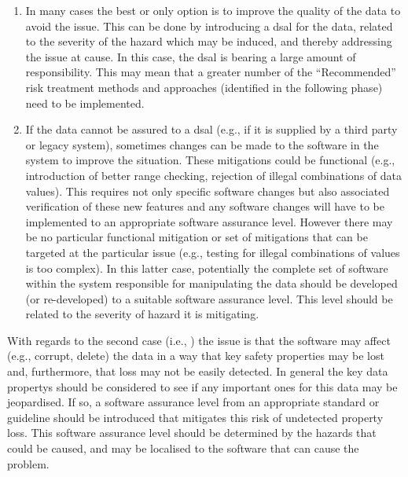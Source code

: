\begin{enumerate}
  \item {} In many cases the best or only option is to improve the quality of the data to avoid the issue. This can be done by introducing a \gls{dsal} for the data, related to the severity of the \gls{hazard} which may be induced, and thereby addressing the issue at cause. In this case, the \gls{dsal} is bearing a large amount of responsibility. This may mean that a greater number of the ``Recommended'' risk \gls{treatment} methods and approaches (identified in the following phase) need to be implemented.
  \item {} If the data cannot be assured to a \gls{dsal} (e.g., if it is supplied by a third party or legacy system), sometimes changes can be made to the software in the system to improve the situation. These mitigations could be functional (e.g., introduction of better range checking, rejection of illegal combinations of data values). This requires not only specific software changes but also associated \gls{verification} of these new features and any software changes will have to be implemented to an appropriate \gls{software assurance level}. However there may be no particular functional mitigation or set of mitigations that can be targeted at the particular issue (e.g., testing for illegal combinations of values is too complex). In this latter case, potentially the complete set of software within the system responsible for manipulating the data should be developed (or re-developed) to a suitable \gls{software assurance level}. This level should be related to the severity of \gls{hazard} it is mitigating.
\end{enumerate}

With regards to the second case (i.e., ) the issue is that the software may affect (e.g., corrupt, delete) the data in a way that key safety properties may be lost and, furthermore, that loss may not be easily detected. In general the key \glspl{data property} should be considered to see if any important ones for this data may be jeopardised. If so, a \gls{software assurance level} from an appropriate standard or guideline should be introduced that mitigates this risk of undetected property loss. This \gls{software assurance level} should be determined by the hazards that could be caused, and may be localised to the software that can cause the problem.

